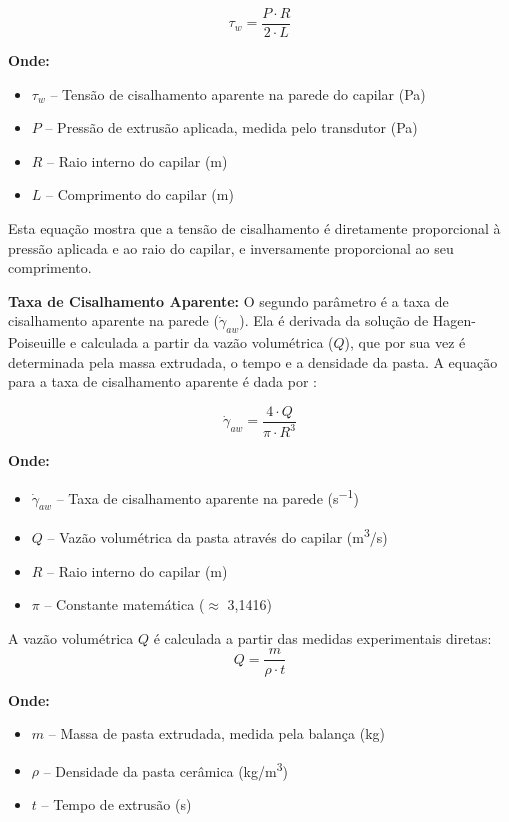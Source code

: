 \documentclass[a4paper,12pt]{article}
\begin{document}
\begin{equation}
    \tau_w = \frac{P \cdot R}{2 \cdot L}
\end{equation}

\textbf{Onde:}
\begin{itemize}[leftmargin=1.5em]
  \item $\tau_w$ -- Tensão de cisalhamento aparente na parede do capilar (\si{Pa})
  \item $P$ -- Pressão de extrusão aplicada, medida pelo transdutor (\si{Pa})
  \item $R$ -- Raio interno do capilar (\si{m})
  \item $L$ -- Comprimento do capilar (\si{m})
\end{itemize}

Esta equação mostra que a tensão de cisalhamento é diretamente proporcional à pressão aplicada e ao raio do capilar, e inversamente proporcional ao seu comprimento.

\vspace{1em}
\textbf{Taxa de Cisalhamento Aparente:} O segundo parâmetro é a taxa de cisalhamento aparente na parede ($\dot{\gamma}_{aw}$). Ela é derivada da solução de Hagen-Poiseuille e calculada a partir da vazão volumétrica ($Q$), que por sua vez é determinada pela massa extrudada, o tempo e a densidade da pasta. A equação para a taxa de cisalhamento aparente é dada por \cite{reed1995}:

\begin{equation}
    \dot{\gamma}_{aw} = \frac{4 \cdot Q}{\pi \cdot R^3}
\end{equation}

\textbf{Onde:}
\begin{itemize}[leftmargin=1.5em]
  \item $\dot{\gamma}_{aw}$ -- Taxa de cisalhamento aparente na parede (\si{s^{-1}})
  \item $Q$ -- Vazão volumétrica da pasta através do capilar (\si{m^3/s})
  \item $R$ -- Raio interno do capilar (\si{m})
  \item $\pi$ -- Constante matemática ($\approx$ 3,1416)
\end{itemize}

A vazão volumétrica $Q$ é calculada a partir das medidas experimentais diretas:
\begin{equation}
    Q = \frac{m}{\rho \cdot t}
\end{equation}

\textbf{Onde:}
\begin{itemize}[leftmargin=1.5em]
  \item $m$ -- Massa de pasta extrudada, medida pela balança (\si{kg})
  \item $\rho$ -- Densidade da pasta cerâmica (\si{kg/m^3})
  \item $t$ -- Tempo de extrusão (\si{s})
\end{itemize}
\end{document}
